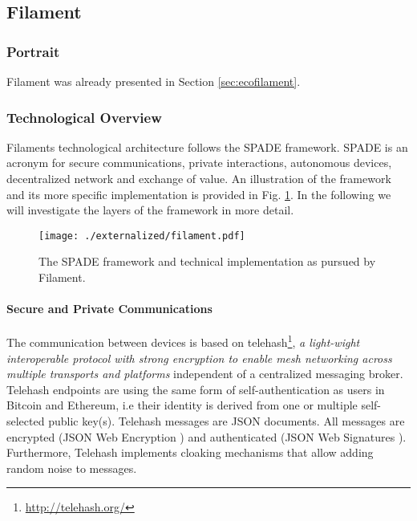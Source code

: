 \subsection{Filament}

\subsubsection{Portrait}

Filament was already presented in Section \ref{sec:ecofilament}. 

\subsubsection{Technological Overview}

Filaments technological architecture follows the SPADE framework. SPADE is an acronym for secure communications, private interactions, autonomous devices, decentralized network and exchange of value. An illustration of the framework and its more specific implementation is provided in Fig. \ref{fig:filament}. In the following we will investigate the layers of the framework in more detail. 

\begin{figure}
\centering
\texttt{[image: ./externalized/filament.pdf]}
\caption{The SPADE framework and technical implementation as pursued by Filament.}
\label{fig:filament}
\end{figure}


\paragraph{Secure and Private Communications}
The communication between devices is based on telehash\footnote{\url{http://telehash.org/}}, \emph{a light-wight interoperable protocol with strong encryption to enable mesh networking across multiple transports and platforms} independent of a centralized messaging broker.  Telehash endpoints are using the same form of self-authentication as users in Bitcoin and Ethereum, i.e their identity is derived from one or multiple self-selected public key(s). Telehash messages are JSON documents. All messages are encrypted (JSON Web Encryption \cite{rfc7516}) and authenticated (JSON Web Signatures \cite{rfc7515}). Furthermore, Telehash implements cloaking mechanisms that allow adding random noise to messages.

